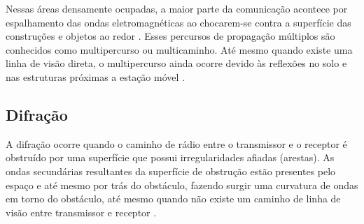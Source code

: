 Nessas áreas densamente ocupadas, a maior parte da comunicação acontece por espalhamento das ondas eletromagnéticas ao chocarem-se contra a superfície das construções e objetos ao redor \cite{haykin2008}.  Esses percursos de propagação múltiplos são conhecidos como multipercurso ou multicaminho. Até mesmo quando existe uma linha de visão direta, o multipercurso ainda ocorre devido às reflexões no solo e nas estruturas próximas a estação móvel \cite{rappaport2009}.
\begin{figure}[H]
	\centering
\end{figure}

\subsection{Difração}
\label{sub:difracao}

\begin{citacao}
	A difração ocorre quando o caminho de rádio entre o transmissor e o receptor é obstruído por uma superfície que possui irregularidades afiadas (arestas). As ondas secundárias resultantes da superfície de obstrução estão presentes pelo espaço e até mesmo por trás do obstáculo, fazendo surgir uma curvatura de ondas em torno do obstáculo, até mesmo quando não existe um caminho de linha de visão entre transmissor e receptor \cite{rappaport2009}.
\end{citacao}

